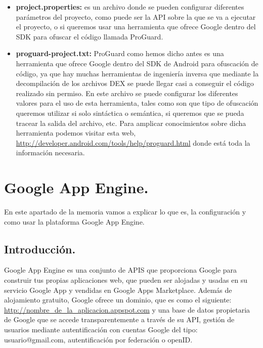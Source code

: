 \begin{itemize}
\begin{itemize}
\item \textbf{project.properties:} es un archivo donde se pueden configurar diferentes parámetros del proyecto, como puede ser la API sobre la que se va a ejecutar el proyecto, o si queremos usar una herramienta que ofrece Google dentro del SDK para ofuscar el código llamada ProGuard.

\item \textbf{proguard-project.txt:} ProGuard como hemos dicho antes es una herramienta que ofrece Google dentro del SDK de Android para ofuscación de código, ya que hay muchas herramientas de ingeniería inversa que mediante la decompilación de los archivos DEX se puede llegar casi a conseguir el código realizado sin permiso. En este archivo se puede configurar los diferentes valores para el uso de esta herramienta, tales como son que tipo de ofuscación queremos utilizar si solo sintáctica o semántica, si queremos que se pueda tracear la salida del archivo, etc. Para amplicar conocimientos sobre dicha herramienta podemos visitar esta web, \url{http://developer.android.com/tools/help/proguard.html} donde está toda la información necesaria.

\end{itemize}



\section{Google App Engine.}\label{cap:GAE}
En este apartado de la memoria vamos a explicar lo que es, la configuración y como usar la plataforma Google App Engine.

\subsection{Introducción.}
Google App Engine es una conjunto de APIS que proporciona Google para construir tus propias aplicaciones web, que pueden ser alojadas y usadas en su servicio Google App y vendidas en Google Apps Marketplace. Además de alojamiento gratuito, Google ofrece un dominio, que es como el siguiente: \url{http://nombre\_de\_la\_aplicacion.appspot.com} y una base de datos propietaria de Google que se accede transparentemente a través de su API, gestión de usuarios mediante autentificación con cuentas Google del tipo: usuario@gmail.com, autentificación por federación o openID.


\end{itemize}
